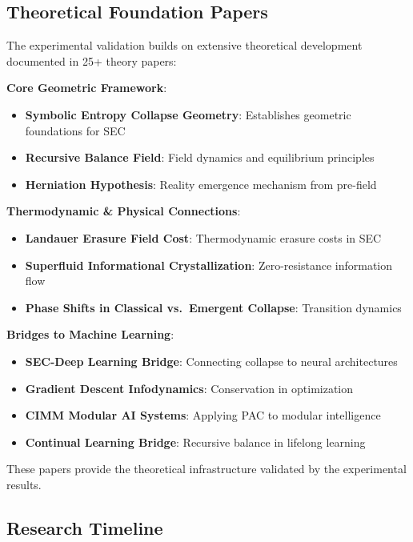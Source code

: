 \documentclass[11pt,a4paper]{article}
\begin{document}
\subsection{Theoretical Foundation Papers}

The experimental validation builds on extensive theoretical development documented in 25+ theory papers:

\textbf{Core Geometric Framework}:
\begin{itemize}
    \item \textbf{Symbolic Entropy Collapse Geometry}: Establishes geometric foundations for SEC
    \item \textbf{Recursive Balance Field}: Field dynamics and equilibrium principles
    \item \textbf{Herniation Hypothesis}: Reality emergence mechanism from pre-field
\end{itemize}

\textbf{Thermodynamic \& Physical Connections}:
\begin{itemize}
    \item \textbf{Landauer Erasure Field Cost}: Thermodynamic erasure costs in SEC
    \item \textbf{Superfluid Informational Crystallization}: Zero-resistance information flow
    \item \textbf{Phase Shifts in Classical vs.\ Emergent Collapse}: Transition dynamics
\end{itemize}

\textbf{Bridges to Machine Learning}:
\begin{itemize}
    \item \textbf{SEC-Deep Learning Bridge}: Connecting collapse to neural architectures
    \item \textbf{Gradient Descent Infodynamics}: Conservation in optimization
    \item \textbf{CIMM Modular AI Systems}: Applying PAC to modular intelligence
    \item \textbf{Continual Learning Bridge}: Recursive balance in lifelong learning
\end{itemize}

These papers provide the theoretical infrastructure validated by the experimental results.

\subsection{Research Timeline}
\end{document}

